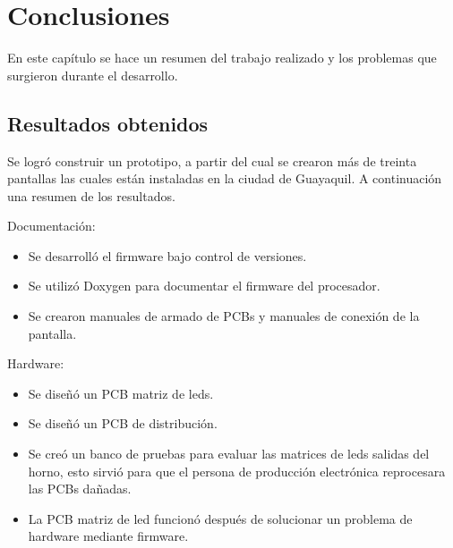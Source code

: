 
\chapter{Conclusiones} %

\label{Chapter5} %

En este capítulo se hace un resumen del trabajo realizado y los problemas que surgieron durante el desarrollo.


\section{Resultados obtenidos}


Se logró construir un prototipo, a partir del cual se crearon más de treinta pantallas las cuales están instaladas en la ciudad de Guayaquil. A continuación una resumen de los resultados.



Documentación:
\begin{itemize}
\item Se desarrolló el firmware bajo control de versiones.
\item Se utilizó Doxygen para documentar el firmware del procesador.
\item Se crearon manuales de armado de PCBs y manuales de conexión de la pantalla.  
\end{itemize}

Hardware:
\begin{itemize}
\item Se diseñó un PCB matriz de leds.
\item Se diseñó un PCB de distribución.
\item Se creó un banco de pruebas para evaluar las matrices de leds salidas del horno, esto sirvió para que el persona de producción electrónica reprocesara las PCBs dañadas.
\item La PCB matriz de led funcionó después de solucionar un problema de hardware mediante firmware.
\end{itemize}

